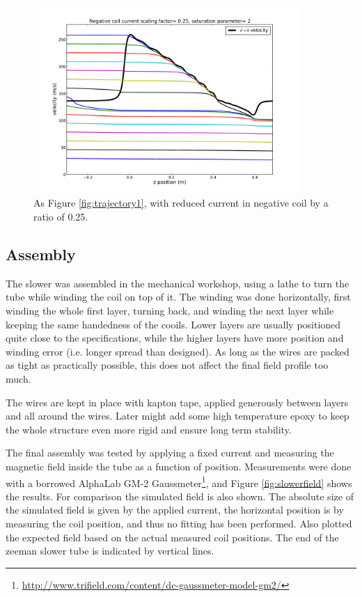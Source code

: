 \documentclass[12pt,a4paper]{article}
\begin{document}
\begin{figure}[htb]
\centering
\includegraphics[width=0.9\textwidth]{trajectory03_3}
\caption{As Figure \ref{fig:trajectory1}, with reduced current in negative coil by a ratio of 0.25.}
\label{fig:trajectory3}
\end{figure}

\subsection{Assembly}

The slower was assembled in the mechanical workshop, using a lathe to turn the tube while winding the coil on top of it. The winding was done horizontally, first winding the whole first layer, turning back, and winding the next layer while keeping the same handedness of the cooils. Lower layers are usually positioned quite close to the specifications, while the higher layers have more position and winding error (i.e. longer spread than designed). As long as the wires are packed as tight as practically possible, this does not affect the final field profile too much.

The wires are kept in place with kapton tape, applied generously between layers and all around the wires. Later might add some high temperature epoxy to keep the whole structure even more rigid and ensure long term stability.

The final assembly was tested by applying a fixed current and measuring the magnetic field inside the tube as a function of position. Measurements were done with a borrowed AlphaLab GM-2 Gaussmeter\footnote{\url{http://www.trifield.com/content/dc-gaussmeter-model-gm2/}}, and Figure \ref{fig:slowerfield} shows the results. For comparison the simulated field is also shown. The absolute size of the simulated field is given by the applied current, the horizontal position is by measuring the coil position, and thus no fitting has been performed. Also plotted the expected field based on the actual measured coil positions. The end of the zeeman slower tube is indicated by vertical lines.
\end{document}
